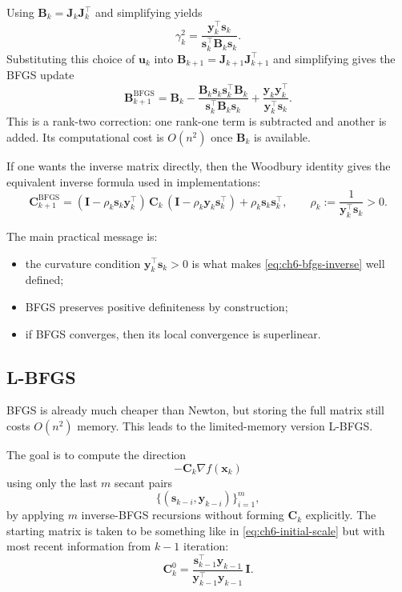 Using $\mathbf{B}_k=\mathbf{J}_k\mathbf{J}_k^\top$ and simplifying yields
\[
  \gamma_k^2
  =
  \frac{\mathbf{y}_k^\top\mathbf{s}_k}
  {\mathbf{s}_k^\top \mathbf{B}_k\mathbf{s}_k}.
\]
Substituting this choice of $\mathbf{u}_k$ into
$\mathbf{B}_{k+1}=\mathbf{J}_{k+1}\mathbf{J}_{k+1}^\top$ and simplifying gives
the BFGS update
\begin{equation}
  \label{eq:ch6-bfgs}
  \mathbf{B}_{k+1}^{\mathrm{BFGS}}
  =\mathbf{B}_k
  -\frac{\mathbf{B}_k\mathbf{s}_k\mathbf{s}_k^\top \mathbf{B}_k}
  {\mathbf{s}_k^\top \mathbf{B}_k\mathbf{s}_k}
  +\frac{\mathbf{y}_k\mathbf{y}_k^\top}
  {\mathbf{y}_k^\top \mathbf{s}_k}.
\end{equation}
This is a rank-two correction: one rank-one term is subtracted and another is
added. Its computational cost is $O(n^2)$ once $\mathbf{B}_k$ is available.

If one wants the inverse matrix directly, then the Woodbury identity gives the
equivalent inverse formula used in implementations:
\begin{equation}
  \label{eq:ch6-bfgs-inverse}
  \mathbf{C}_{k+1}^{\mathrm{BFGS}}
  =(\mathbf{I}-\rho_k \mathbf{s}_k\mathbf{y}_k^\top)\,
  \mathbf{C}_k\,
  (\mathbf{I}-\rho_k \mathbf{y}_k\mathbf{s}_k^\top)
  +\rho_k \mathbf{s}_k\mathbf{s}_k^\top,
  \qquad
  \rho_k:=\frac{1}{\mathbf{y}_k^\top \mathbf{s}_k}>0.
\end{equation}

The main practical message is:
\begin{itemize}
  \item the curvature condition $\mathbf{y}_k^\top \mathbf{s}_k>0$ is what
  makes \eqref{eq:ch6-bfgs-inverse} well defined;
  \item BFGS preserves positive definiteness by construction;
  \item if BFGS converges, then its local convergence is superlinear.
\end{itemize}

\subsection{L-BFGS}
\label{sec:ch6-lbfgs}
BFGS is already much cheaper than Newton, but storing the full matrix still
costs $O(n^2)$ memory. This leads to the limited-memory version L-BFGS.

The goal is to compute the direction
\[
  -\mathbf{C}_k \nabla f(\mathbf{x}_k)
\]
using only the last $m$ secant pairs
\[
  \{(\mathbf{s}_{k-i},\mathbf{y}_{k-i})\}_{i=1}^{m},
\]
by applying $m$ inverse-BFGS recursions without forming $\mathbf{C}_k$
explicitly. The starting matrix is taken to be something like in \cref{eq:ch6-initial-scale} but with most
recent information from $k-1$ iteration:
\[
  \mathbf{C}_k^0
  =
  \frac{\mathbf{s}_{k-1}^\top \mathbf{y}_{k-1}}
  {\mathbf{y}_{k-1}^\top \mathbf{y}_{k-1}}\,\mathbf{I}.
\]

